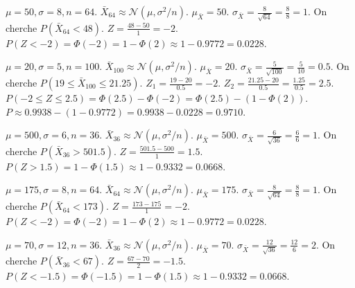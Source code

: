 \begin{correctionbox}
$\mu=50, \sigma=8, n=64$. $\bar{X}_{64} \approx \mathcal{N}(\mu, \sigma^2/n)$.
$\mu_{\bar{X}} = 50$. $\sigma_{\bar{X}} = \frac{8}{\sqrt{64}} = \frac{8}{8} = 1$.
On cherche $P(\bar{X}_{64} < 48)$.
$Z = \frac{48 - 50}{1} = -2$.
$P(Z < -2) = \Phi(-2) = 1 - \Phi(2) \approx 1 - 0.9772 = 0.0228$.
\end{correctionbox}

\begin{correctionbox}
$\mu=20, \sigma=5, n=100$. $\bar{X}_{100} \approx \mathcal{N}(\mu, \sigma^2/n)$.
$\mu_{\bar{X}} = 20$. $\sigma_{\bar{X}} = \frac{5}{\sqrt{100}} = \frac{5}{10} = 0.5$.
On cherche $P(19 \le \bar{X}_{100} \le 21.25)$.
$Z_1 = \frac{19 - 20}{0.5} = -2$.
$Z_2 = \frac{21.25 - 20}{0.5} = \frac{1.25}{0.5} = 2.5$.
$P(-2 \le Z \le 2.5) = \Phi(2.5) - \Phi(-2) = \Phi(2.5) - (1 - \Phi(2))$.
$P \approx 0.9938 - (1 - 0.9772) = 0.9938 - 0.0228 = 0.9710$.
\end{correctionbox}

\begin{correctionbox}
$\mu=500, \sigma=6, n=36$. $\bar{X}_{36} \approx \mathcal{N}(\mu, \sigma^2/n)$.
$\mu_{\bar{X}} = 500$. $\sigma_{\bar{X}} = \frac{6}{\sqrt{36}} = \frac{6}{6} = 1$.
On cherche $P(\bar{X}_{36} > 501.5)$.
$Z = \frac{501.5 - 500}{1} = 1.5$.
$P(Z > 1.5) = 1 - \Phi(1.5) \approx 1 - 0.9332 = 0.0668$.
\end{correctionbox}

\begin{correctionbox}
$\mu=175, \sigma=8, n=64$. $\bar{X}_{64} \approx \mathcal{N}(\mu, \sigma^2/n)$.
$\mu_{\bar{X}} = 175$. $\sigma_{\bar{X}} = \frac{8}{\sqrt{64}} = \frac{8}{8} = 1$.
On cherche $P(\bar{X}_{64} < 173)$.
$Z = \frac{173 - 175}{1} = -2$.
$P(Z < -2) = \Phi(-2) = 1 - \Phi(2) \approx 1 - 0.9772 = 0.0228$.
\end{correctionbox}

\begin{correctionbox}
$\mu=70, \sigma=12, n=36$. $\bar{X}_{36} \approx \mathcal{N}(\mu, \sigma^2/n)$.
$\mu_{\bar{X}} = 70$. $\sigma_{\bar{X}} = \frac{12}{\sqrt{36}} = \frac{12}{6} = 2$.
On cherche $P(\bar{X}_{36} < 67)$.
$Z = \frac{67 - 70}{2} = -1.5$.
$P(Z < -1.5) = \Phi(-1.5) = 1 - \Phi(1.5) \approx 1 - 0.9332 = 0.0668$.
\end{correctionbox}

